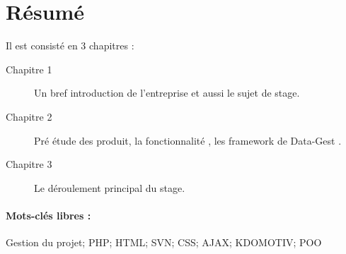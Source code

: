 \chapter*{Résumé}
\flushleft

Il est consisté en 3 chapitres :

\begin{description}
\item [Chapitre 1] Un bref introduction de l'entreprise et aussi le sujet de stage.
\item [Chapitre 2] Pré étude des produit, la fonctionnalité , les framework de Data-Gest .
\item [Chapitre 3] Le déroulement principal du stage. 
\end{description}

\subsubsection*{Mots-clés libres :}
Gestion du projet; PHP; HTML; SVN; CSS; AJAX; KDOMOTIV; POO


